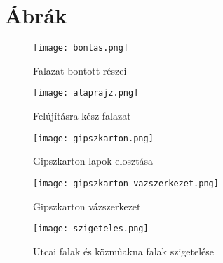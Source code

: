\clearpage
\section{Ábrák}
\label{sec:abrak}
\begin{figure}[h]
\texttt{[image: bontas.png]}
\caption{Falazat bontott részei}
\label{fig:bontas}
\end{figure}
\begin{figure}[h]
\texttt{[image: alaprajz.png]}
\caption{Felújításra kész falazat}
\label{fig:alaprajz}
\end{figure}
\begin{figure}[h]
\texttt{[image: gipszkarton.png]}
\caption{Gipszkarton lapok elosztása}
\label{fig:gipszkarton}
\end{figure}
\begin{figure}[h]
\texttt{[image: gipszkarton\_vazszerkezet.png]}
\caption{Gipszkarton vázszerkezet}
\label{fig:gipszkarton_vaz}
\end{figure}
\begin{figure}[h]
\texttt{[image: szigeteles.png]}
\caption{Utcai falak és közműakna falak szigetelése}
\label{fig:szigeteles}
\end{figure}

\clearpage
{}
\label{sec:abrajegyzek}
\listoffigures

\clearpage
{}
\label{sec:tablajegyzek}
\listoftables

\clearpage
{}
\label{sec:targymutato}
\printindex

\clearpage
{}
\label{sec:melleklet}
%


